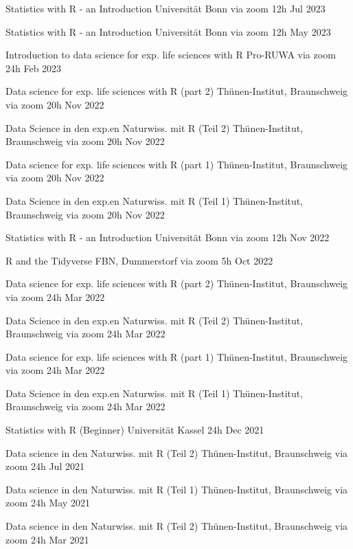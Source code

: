 \documentclass[11pt,a4paper,]{awesome-cv}
\begin{document}
\begin{cvhonors} 
\cvhonor
{Statistics with R - an Introduction  }
{Universität Bonn via zoom}
{12h}
{Jul 2023  }

\cvhonor
{Statistics with R - an Introduction  }
{Universität Bonn via zoom}
{12h}
{May 2023  }

\cvhonor
{Introduction to data science for exp. life sciences with R  }
{Pro-RUWA via zoom}
{24h}
{Feb 2023  }

\cvhonor
{Data science for exp. life sciences with R (part 2)  }
{Thünen-Institut, Braunschweig via zoom}
{20h}
{Nov 2022  }

\cvhonor
{Data Science in den exp.en Naturwiss. mit R (Teil 2)  }
{Thünen-Institut, Braunschweig via zoom}
{20h}
{Nov 2022  }

\cvhonor
{Data science for exp. life sciences with R (part 1)  }
{Thünen-Institut, Braunschweig via zoom}
{20h}
{Nov 2022  }

\cvhonor
{Data Science in den exp.en Naturwiss. mit R (Teil 1)  }
{Thünen-Institut, Braunschweig via zoom}
{20h}
{Nov 2022  }

\cvhonor
{Statistics with R - an Introduction  }
{Universität Bonn via zoom}
{12h}
{Nov 2022  }

\cvhonor
{R and the {Tidyverse}  }
{FBN, Dummerstorf via zoom}
{5h}
{Oct 2022  }

\cvhonor
{Data science for exp. life sciences with R (part 2)  }
{Thünen-Institut, Braunschweig via zoom}
{24h}
{Mar 2022  }

\cvhonor
{Data Science in den exp.en Naturwiss. mit R (Teil 2)  }
{Thünen-Institut, Braunschweig via zoom}
{24h}
{Mar 2022  }

\cvhonor
{Data science for exp. life sciences with R (part 1)  }
{Thünen-Institut, Braunschweig via zoom}
{24h}
{Mar 2022  }

\cvhonor
{Data Science in den exp.en Naturwiss. mit R (Teil 1)  }
{Thünen-Institut, Braunschweig via zoom}
{24h}
{Mar 2022  }

\cvhonor
{Statistics with R (Beginner)  }
{Universität Kassel}
{24h}
{Dec 2021  }

\cvhonor
{Data science in den Naturwiss. mit R (Teil 2)  }
{Thünen-Institut, Braunschweig via zoom}
{24h}
{Jul 2021  }

\cvhonor
{Data science in den Naturwiss. mit R (Teil 1)  }
{Thünen-Institut, Braunschweig via zoom}
{24h}
{May 2021  }

\cvhonor
{Data science in den Naturwiss. mit R (Teil 2)  }
{Thünen-Institut, Braunschweig via zoom}
{24h}
{Mar 2021  }


\end{cvhonors}
\end{document}
